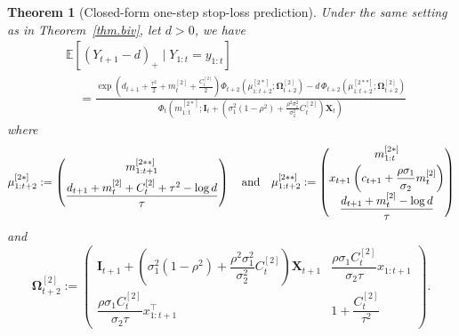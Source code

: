 \documentclass[11pt,authoryear]{elsarticle}
\def\E#1{{\mathbb E}\left[#1\right]}
\newtheorem{theorem}{Theorem}
\theoremstyle{nopunct}
\numberwithin{equation}{section}
\begin{document}
\begin{theorem}[Closed-form one-step stop-loss prediction]
\label{cor.stop.loss.biv}
Under the same setting as in Theorem~\ref{thm.biv}, let \(d>0\),  we have
\[
\begin{aligned}
&\E{
(Y_{t+1}-d)_+
\mid
Y_{1:t}=y_{1:t}
}\\
&\quad=
\frac{
\exp\left(
d_{t+1}
+
\frac{\tau^2}{2}
+
m_t^{[2]}
+
\frac{C_t^{[2]}}{2}
\right)
\Phi_{t+2}
\left(
\mu_{1:t+2}^{[2*]};
\boldsymbol\Omega_{t+2}^{[2]}
\right)-
d\,
\Phi_{t+2}
\left(
\mu_{1:t+2}^{[2**]};
\boldsymbol\Omega_{t+2}^{[2]}
\right)
}{
\Phi_t
\left(
m_{1:t}^{[2*]};
\boldsymbol I_t
+
\left(
\sigma_1^2(1-\rho^2)
+
\frac{\rho^2\sigma_1^2}{\sigma_2^2}C_t^{[2]}
\right)
\boldsymbol X_t
\right)
}
\end{aligned}
\]
where
\[
\mu_{1:t+2}^{[2*]}:=\begin{pmatrix}
m_{1:t+1}^{[2**]}\\[0.15cm]
\dfrac{
d_{t+1}+m_t^{[2]}+C_t^{[2]}+\tau^2-\log d
}{\tau}
\end{pmatrix}
\quad\hbox{and}\quad
\mu_{1:t+2}^{[2**]}:=\begin{pmatrix}
m_{1:t}^{[2*]}\\[0.1cm]
x_{t+1}\left(
c_{t+1}
+
\dfrac{\rho\sigma_1}{\sigma_2}m_t^{[2]}
\right)\\[0.15cm]
\dfrac{
d_{t+1}+m_t^{[2]}-\log d
}{\tau}
\end{pmatrix}
\]
and
\[
\boldsymbol\Omega_{t+2}^{[2]}
:=
\begin{pmatrix}
\boldsymbol I_{t+1}
+
\left(
\sigma_1^2(1-\rho^2)
+
\dfrac{\rho^2\sigma_1^2}{\sigma_2^2}C_t^{[2]}
\right)
\boldsymbol X_{t+1}
&
\dfrac{\rho\sigma_1C_t^{[2]}}{\sigma_2\tau}
x_{1:t+1}
\\[0.4cm]
\dfrac{\rho\sigma_1C_t^{[2]}}{\sigma_2\tau}
x_{1:t+1}^{\top}
&
1+\dfrac{C_t^{[2]}}{\tau^2}
\end{pmatrix}.
\]
\end{theorem}
\end{document}
